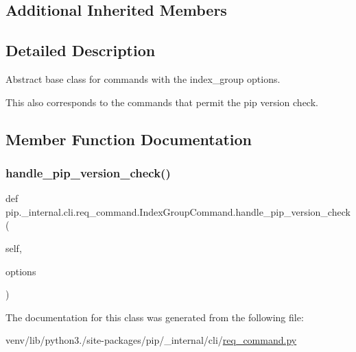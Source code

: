 \subsection*{Additional Inherited Members}


\subsection{Detailed Description}
\begin{DoxyVerb}Abstract base class for commands with the index_group options.

This also corresponds to the commands that permit the pip version check.
\end{DoxyVerb}
 

\subsection{Member Function Documentation}
\mbox{\label{classpip_1_1__internal_1_1cli_1_1req__command_1_1IndexGroupCommand_a9800c4d19c06cfc074842bd5dd94ffed}} 
\subsubsection{\texorpdfstring{handle\+\_\+pip\+\_\+version\+\_\+check()}{handle\_pip\_version\_check()}}
{\footnotesize\ttfamily def pip.\+\_\+internal.\+cli.\+req\+\_\+command.\+Index\+Group\+Command.\+handle\+\_\+pip\+\_\+version\+\_\+check (\begin{DoxyParamCaption}\item[{}]{self,  }\item[{}]{options }\end{DoxyParamCaption})}



The documentation for this class was generated from the following file\+:\begin{DoxyCompactItemize}
\item 
venv/lib/python3./site-\/packages/pip/\+\_\+internal/cli/\hyperlink{req__command_8py}{req\+\_\+command.\+py}\end{DoxyCompactItemize}

